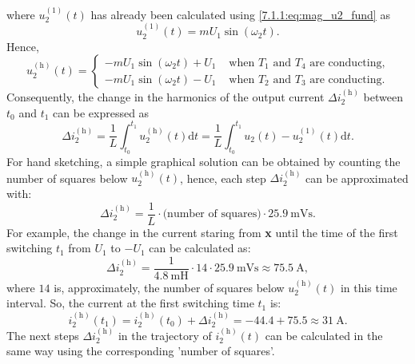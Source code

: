 \begin{solutionblock}
    where $u^{(1)}_\mathrm{2}(t)$ has already been calculated using \eqref{7.1.1:eq:mag_u2_fund} as
    \begin{equation}
        u^{(1)}_\mathrm{2}(t) = m U_{\mathrm{1}} \sin(\omega_2 t).         
    \end{equation}
    Hence,
    \begin{equation}
        u^{(\mathrm{h})}_\mathrm{2}(t) =  \begin{cases}
            - m U_{\mathrm{1}} \sin(\omega_2 t) + U_{\mathrm{1}} &\text{ when $T_1$ and $T_4$ are conducting,}\\
            - m U_{\mathrm{1}} \sin(\omega_2 t)  - U_{\mathrm{1}} &\text{ when $T_2$ and $T_3$ are conducting}.
            \end{cases}
        \label{7.1.2:eq:u_2_harm_cases}         
    \end{equation}
    Consequently, the change in the harmonics of the output current $\Delta i^{(\mathrm{h})}_\mathrm{2}$ between $t_0$ and $t_1$ can be expressed as 
    \begin{equation}
        \Delta i^{(\mathrm{h})}_\mathrm{2} = \frac{1}{L} \int_{t_0}^{t_1} u^{(\mathrm{h})}_\mathrm{2}(t) \mathrm{d}t = \frac{1}{L} \int_{t_0}^{t_1} u_\mathrm{2}(t) - u^{(1)}_\mathrm{2}(t) \mathrm{d}t.
        \label{7.1.2:eq:i_2_harm}         
    \end{equation}
    For hand sketching, a simple graphical solution can be obtained by counting the number of squares below $u^{(\mathrm{h})}_\mathrm{2}(t)$, hence,
    each step $\Delta i^{(\mathrm{h})}_\mathrm{2}$ can be approximated with:
        \begin{equation}
            \Delta i^{(\mathrm{h})}_\mathrm{2} = \frac{1}{L} \cdot \text{(number of squares)} \cdot \SI{25.9}{\milli \volt \second}.
            \label{7.1.2:eq:approx_i_2_harm}         
        \end{equation}
        For example, the change in the current staring from \textbf{x} until the time of the first switching $t_1$ from $U_1$ to $-U_1$ can be calculated as:
        \begin{equation}
            \Delta i^{(\mathrm{h})}_\mathrm{2} = \frac{1}{\SI{4.8}{\milli \henry}} \cdot 14 \cdot \SI{25.9}{\milli \volt \second} \approx \SI{75.5}{\ampere},
            \label{7.1.2:eq:approx_i_2_harm_example}         
        \end{equation}
        where $14$ is, approximately, the number of squares below $u^{(\mathrm{h})}_\mathrm{2}(t)$ in this time interval. So, the current at the first switching time $t_1$ is:
        \begin{equation}
            i^{(\mathrm{h})}_\mathrm{2}(t_1) = i^{(\mathrm{h})}_\mathrm{2}(t_0) + \Delta i^{(\mathrm{h})}_\mathrm{2} = -44.4 + 75.5 \approx \SI{31}{\ampere}.
            \label{7.1.2:eq:approx_i_2_harm_t1}         
        \end{equation}
        The next steps $\Delta i^{(\mathrm{h})}_\mathrm{2}$ in the trajectory of $i^{(\mathrm{h})}_\mathrm{2}(t)$ can be calculated in the same way
        using the corresponding 'number of squares'.  
\end{solutionblock}
